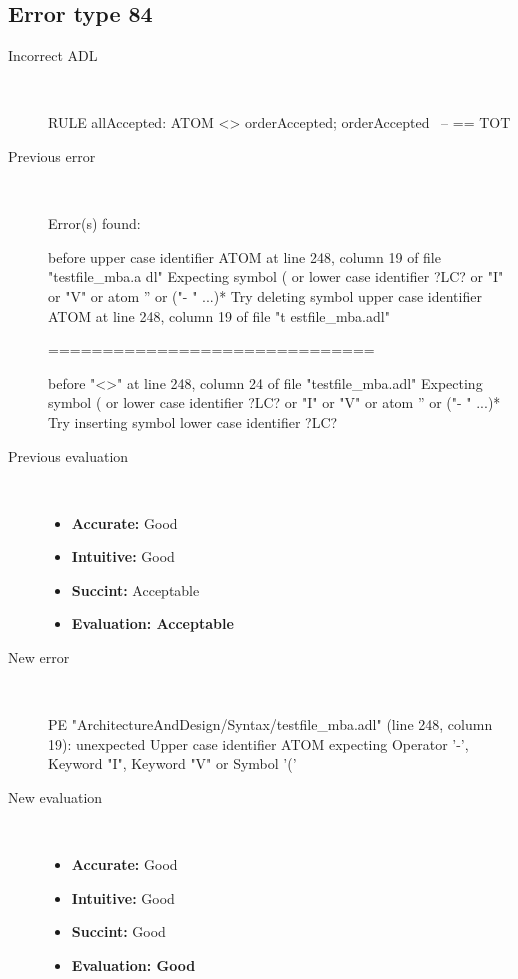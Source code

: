 \hrulefill

\subsection{Error type 84}
  \begin{description}
  \item[Incorrect ADL]~\\
\begin{adl}
RULE allAccepted: ATOM <> orderAccepted; orderAccepted~ -- == TOT\end{adl}
  \item[Previous error]~\\
\begin{haskell}
Error(s) found:

before upper case identifier ATOM at line 248, column 19 of file "testfile_mba.a
dl"
Expecting symbol ( or lower case identifier ?LC? or "I" or "V" or atom '' or ("-
" ...)*
Try deleting symbol upper case identifier ATOM at line 248, column 19 of file "t
estfile_mba.adl"

==============================

before "<>" at line 248, column 24 of file "testfile_mba.adl"
Expecting symbol ( or lower case identifier ?LC? or "I" or "V" or atom '' or ("-
" ...)*
Try inserting symbol lower case identifier ?LC?
\end{haskell}
  \item[Previous evaluation]~\\
    \begin{itemize}
    \item \textbf{Accurate:} Good
    \item \textbf{Intuitive:} Good
    \item \textbf{Succint:} Acceptable
    \item \textbf{Evaluation: Acceptable}
    \end{itemize}
  \item[New error]~\\
\begin{haskell}
PE "ArchitectureAndDesign/Syntax/testfile_mba.adl" (line 248, column 19):
unexpected Upper case identifier ATOM
expecting Operator '-', Keyword "I", Keyword "V" or Symbol '('
\end{haskell}
  \item[New evaluation]~\\
    \begin{itemize}
    \item \textbf{Accurate:} Good
    \item \textbf{Intuitive:} Good
    \item \textbf{Succint:} Good
    \item \textbf{Evaluation: Good
}
    \end{itemize}
  \end{description}

